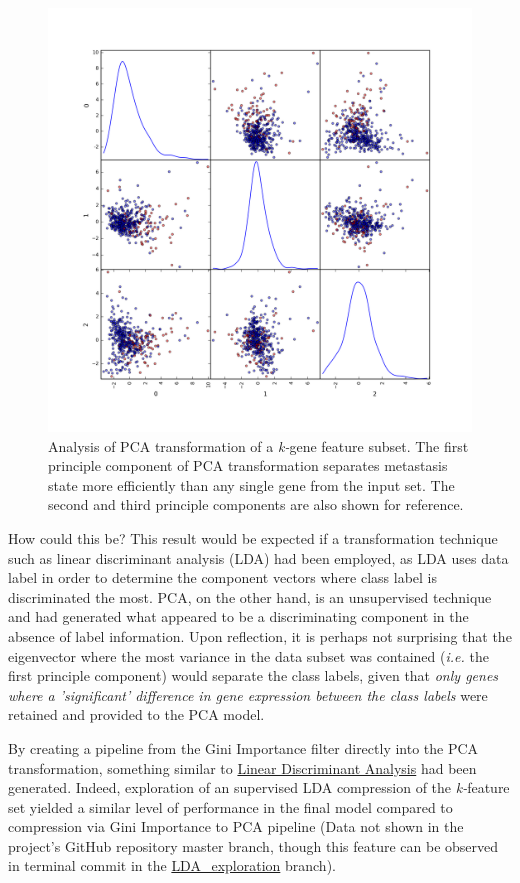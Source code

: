 \documentclass[final]{article}
\begin{document}
\begin{figure}[h!]
  \centering
  \includegraphics[scale = 0.5]{pcaScatter}
  \caption{\label{fig:pcaScatter}Analysis of PCA transformation of a \textit{k-}gene feature subset.  The first principle component of PCA transformation separates metastasis state more efficiently than any single gene from the input set.  The second and third principle components are also shown for reference.}
\end{figure}

How could this be?  This result would be expected if a transformation technique
such as linear discriminant analysis (LDA) had been employed, as LDA uses data
label in order to determine the component vectors where class label is
discriminated the most.  PCA, on the other hand, is an unsupervised technique
and had generated what appeared to be a discriminating component in the absence of
label information.  Upon reflection, it is perhaps not surprising that
the eigenvector where the most variance in the data subset was contained (\textit{i.e.}
the first principle component) would separate the class labels, given that
\textit{only genes where a 'significant' difference in gene expression between the
class labels} were retained and provided to the PCA model.

By creating a pipeline from the  Gini Importance filter directly into the PCA
transformation, something similar to
\href{http://scikit-learn.org/0.16/modules/generated/sklearn.lda.LDA.html}{Linear
Discriminant Analysis} had been generated.  Indeed, exploration of an supervised
LDA compression of the \textit{k-}feature set yielded a similar level of
performance in the final model compared to compression via Gini Importance to
PCA pipeline (Data not shown in  the project's GitHub repository master branch,
though this feature can be observed in terminal commit in the
\href{https://github.com/CCThompson82/MLE_capstone/commit/d9b0c14ebe69603381b52093cb0ea35b0ca3b3b7}{LDA\_exploration}
branch).
\end{document}
